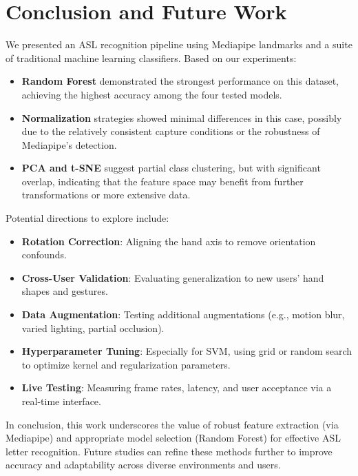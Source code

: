 \documentclass{article}
\begin{document}
\section{Conclusion and Future Work}
We presented an ASL recognition pipeline using Mediapipe landmarks and a suite of traditional machine learning classifiers. Based on our experiments:
\begin{itemize}
    \item \textbf{Random Forest} demonstrated the strongest performance on this dataset, achieving the highest accuracy among the four tested models.
    \item \textbf{Normalization} strategies showed minimal differences in this case, possibly due to the relatively consistent capture conditions or the robustness of Mediapipe’s detection.
    \item \textbf{PCA and t-SNE} suggest partial class clustering, but with significant overlap, indicating that the feature space may benefit from further transformations or more extensive data.
\end{itemize}
Potential directions to explore include:
\begin{itemize}
    \item \textbf{Rotation Correction}: Aligning the hand axis to remove orientation confounds.
    \item \textbf{Cross-User Validation}: Evaluating generalization to new users’ hand shapes and gestures.
    \item \textbf{Data Augmentation}: Testing additional augmentations (e.g., motion blur, varied lighting, partial occlusion).
    \item \textbf{Hyperparameter Tuning}: Especially for SVM, using grid or random search to optimize kernel and regularization parameters.
    \item \textbf{Live Testing}: Measuring frame rates, latency, and user acceptance via a real-time interface.
\end{itemize}

In conclusion, this work underscores the value of robust feature extraction (via Mediapipe) and appropriate model selection (Random Forest) for effective ASL letter recognition. Future studies can refine these methods further to improve accuracy and adaptability across diverse environments and users.



\end{document}
